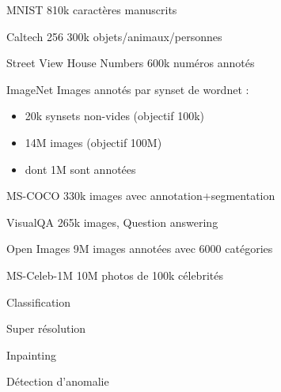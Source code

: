 \begin{frame}{MNIST}
  810k caractères manuscrits
\end{frame}

\begin{frame}{Caltech 256}
  300k objets/animaux/personnes
\end{frame}

\begin{frame}{Street View House Numbers}
  600k numéros annotés
\end{frame}

\begin{frame}{ImageNet}
  Images annotés par synset de wordnet :
  \begin{itemize}
    \item 20k synsets non-vides (objectif 100k)
    \item 14M images (objectif 100M)
    \item dont 1M sont annotées
  \end{itemize}
\end{frame}

\begin{frame}{MS-COCO}
   330k images avec annotation+segmentation
\end{frame}

\begin{frame}{VisualQA}
  265k images, Question answering
\end{frame}

\begin{frame}{Open Images}
  9M images annotées avec 6000 catégories
\end{frame}

\begin{frame}{MS-Celeb-1M}
  10M photos de 100k célebrités
\end{frame}

\begin{frame}{Classification}
\end{frame}

\begin{frame}{Super résolution}
\end{frame}

\begin{frame}{Inpainting}
\end{frame}

\begin{frame}{Détection d'anomalie}
\end{frame}
